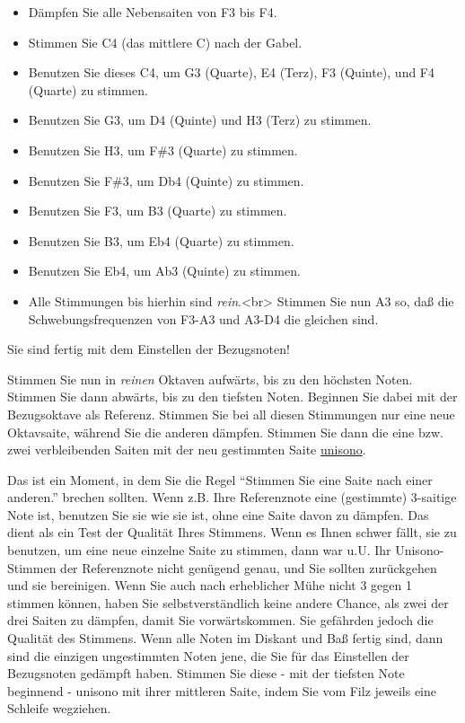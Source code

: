 \begin{itemize} 
 \item Dämpfen Sie alle Nebensaiten von F3 bis F4.
 \item Stimmen Sie C4 (das mittlere C) nach der Gabel.
 \item Benutzen Sie dieses C4, um G3 (Quarte), E4 (Terz), F3 (Quinte), und F4 (Quarte) zu stimmen.
 \item Benutzen Sie G3, um D4 (Quinte) und H3 (Terz) zu stimmen.
 \item Benutzen Sie H3, um F\#3 (Quarte) zu stimmen.
 \item Benutzen Sie F\#3, um Db4 (Quinte) zu stimmen.
 \item Benutzen Sie F3, um B3 (Quarte) zu stimmen.
 \item Benutzen Sie B3, um Eb4 (Quarte) zu stimmen.
 \item Benutzen Sie Eb4, um Ab3 (Quinte) zu stimmen.
 \item Alle Stimmungen bis hierhin sind \textit{rein}.<br>
Stimmen Sie nun A3 so, daß die Schwebungsfrequenzen von F3-A3 und A3-D4 die gleichen sind.
 \end{itemize}

Sie sind fertig mit dem Einstellen der Bezugsnoten!


\label{c2_6_kirn2}

Stimmen Sie nun in \textit{reinen} Oktaven aufwärts, bis zu den höchsten Noten.
Stimmen Sie dann abwärts, bis zu den tiefsten Noten.
Beginnen Sie dabei mit der Bezugsoktave als Referenz.
Stimmen Sie bei all diesen Stimmungen nur eine neue Oktavsaite, während Sie die anderen dämpfen.
Stimmen Sie dann die eine bzw. zwei verbleibenden Saiten mit der neu gestimmten Saite \hyperref[c2_5_unis]{unisono}.

Das ist ein Moment, in dem Sie die Regel \enquote{Stimmen Sie eine Saite nach einer anderen.} brechen sollten.
Wenn z.B. Ihre Referenznote eine (gestimmte) 3-saitige Note ist, benutzen Sie sie wie sie ist, ohne eine Saite davon zu dämpfen.
Das dient als ein Test der Qualität Ihres Stimmens.
Wenn es Ihnen schwer fällt, sie zu benutzen, um eine neue einzelne Saite zu stimmen, dann war u.U. Ihr Unisono-Stimmen der Referenznote nicht genügend genau, und Sie sollten zurückgehen und sie bereinigen.
Wenn Sie auch nach erheblicher Mühe nicht 3 gegen 1 stimmen können, haben Sie selbstverständlich keine andere Chance, als zwei der drei Saiten zu dämpfen, damit Sie vorwärtskommen.
Sie gefährden jedoch die Qualität des Stimmens.
Wenn alle Noten im Diskant und Baß fertig sind, dann sind die einzigen ungestimmten Noten jene, die Sie für das Einstellen der Bezugsnoten gedämpft haben.
Stimmen Sie diese - mit der tiefsten Note beginnend - unisono mit ihrer mittleren Saite, indem Sie vom Filz jeweils eine Schleife wegziehen.
 

